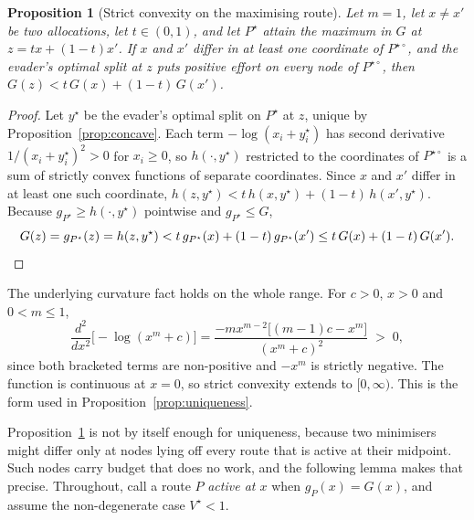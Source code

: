 \documentclass[10pt,a4paper,twoside]{article}
\theoremstyle{plain}
\newtheorem{proposition}[theorem]{Proposition}
\theoremstyle{definition}
\begin{document}
\begin{proposition}[Strict convexity on the maximising route]
\label{prop:partial-strict}
Let $m=1$, let $x\ne x'$ be two allocations, let $t\in(0,1)$, and let
$P^{\star}$ attain the maximum in $G$ at $z=tx+(1-t)x'$. If $x$ and $x'$
differ in at least one coordinate of $P^{\star\circ}$, and the evader's
optimal split at $z$ puts positive effort on every node of $P^{\star\circ}$,
then $G(z)<t\,G(x)+(1-t)\,G(x')$.
\end{proposition}
\begin{proof}
Let $y^{\star}$ be the evader's optimal split on $P^{\star}$ at $z$, unique
by Proposition~\ref{prop:concave}. Each term $-\log(x_i+y^{\star}_i)$ has
second derivative $1/(x_i+y^{\star}_i)^2>0$ for $x_i\ge0$, so
$h(\cdot,y^{\star})$ restricted to the coordinates of $P^{\star\circ}$ is a
sum of strictly convex functions of separate coordinates. Since $x$ and $x'$
differ in at least one such coordinate,
$h(z,y^{\star})<t\,h(x,y^{\star})+(1-t)\,h(x',y^{\star})$. Because
$g_{P^{\star}}\ge h(\cdot,y^{\star})$ pointwise and $g_{P^{\star}}\le G$,
\[
  G(z)=g_{P^{\star}}(z)=h(z,y^{\star})
  <t\,g_{P^{\star}}(x)+(1-t)\,g_{P^{\star}}(x')\le t\,G(x)+(1-t)\,G(x').
  \qedhere
\]
\end{proof}

The underlying curvature fact holds on the whole range. For $c>0$, $x>0$ and
$0<m\le1$,
\begin{equation}
  \frac{d^2}{dx^2}\bigl[-\log(x^m+c)\bigr]
  = \frac{-m x^{m-2}\bigl[(m-1)c-x^m\bigr]}{(x^m+c)^2} \;>\;0 ,
  \label{eq:second-deriv}
\end{equation}
since both bracketed terms are non-positive and $-x^m$ is strictly negative.
The function is continuous at $x=0$, so strict convexity extends to
$[0,\infty)$. This is the form used in Proposition~\ref{prop:uniqueness}.

Proposition~\ref{prop:partial-strict} is not by itself enough for uniqueness,
because two minimisers might differ only at nodes lying off every route that
is active at their midpoint. Such nodes carry budget that does no work, and
the following lemma makes that precise. Throughout, call a route $P$
\emph{active at $x$} when $g_P(x)=G(x)$, and assume the non-degenerate case
$V^{\star}<1$.
\end{document}
